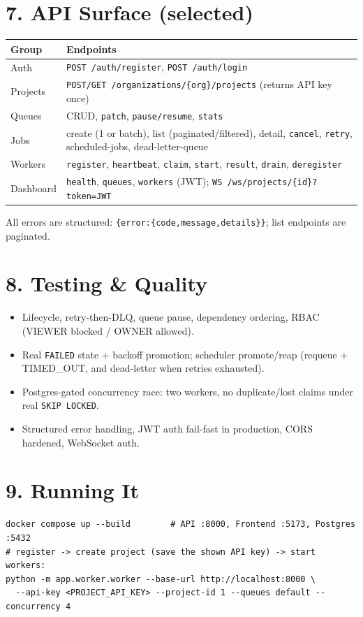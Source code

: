 \documentclass[11pt]{article}
\begin{document}
\section*{7. API Surface (selected)}
\begin{tabularx}{\textwidth}{l X}
\toprule
Group & Endpoints \\
\midrule
Auth & \texttt{POST /auth/register}, \texttt{POST /auth/login} \\
Projects & \texttt{POST/GET /organizations/\{org\}/projects} (returns API key once) \\
Queues & CRUD, \texttt{patch}, \texttt{pause/resume}, \texttt{stats} \\
Jobs & create (1 or batch), list (paginated/filtered), detail, \texttt{cancel}, \texttt{retry},
      scheduled-jobs, dead-letter-queue \\
Workers & \texttt{register}, \texttt{heartbeat}, \texttt{claim}, \texttt{start}, \texttt{result},
         \texttt{drain}, \texttt{deregister} \\
Dashboard & \texttt{health}, \texttt{queues}, \texttt{workers} (JWT); \texttt{WS /ws/projects/\{id\}?token=JWT} \\
\bottomrule
\end{tabularx}
All errors are structured: \texttt{\{error:\{code,message,details\}\}}; list endpoints are paginated.

\section*{8. Testing \& Quality}
\begin{itemize}
  \item Lifecycle, retry-then-DLQ, queue pause, dependency ordering, RBAC (VIEWER blocked / OWNER allowed).
  \item Real \texttt{FAILED} state + backoff promotion; scheduler promote/reap (requeue + TIMED\_OUT, and
        dead-letter when retries exhausted).
  \item Postgres-gated concurrency race: two workers, no duplicate/lost claims under real \texttt{SKIP LOCKED}.
  \item Structured error handling, JWT auth fail-fast in production, CORS hardened, WebSocket auth.
\end{itemize}

\section*{9. Running It}
\begin{verbatim}
docker compose up --build        # API :8000, Frontend :5173, Postgres :5432
# register -> create project (save the shown API key) -> start workers:
python -m app.worker.worker --base-url http://localhost:8000 \
  --api-key <PROJECT_API_KEY> --project-id 1 --queues default --concurrency 4
\end{verbatim}
\end{document}

